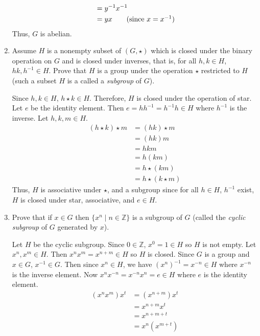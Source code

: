 \begin{enumerate}
\begin{align*}
       & = y^{-1}x^{-1}\\
       & = yx\tag{since \(x = x^{-1}\)}
  \end{align*}
  Thus, \(G\) is abelian.
\item
  Assume \(H\) is a nonempty subset of \((G, \star)\) which is closed under the
  binary operation on \(G\) and is closed under inverses, that is, for all
  \(h,k\in H\), \(hk, h^{-1}\in H\).
  Prove that \(H\) is a group under the operation \(\star\) restricted to
  \(H\) (such a subset \(H\) is a called a \textit{subgroup} of \(G\)).
  \par\smallskip
  Since \(h,k\in H\), \(h\star k\in H\).
  Therefore, \(H\) is closed under the operation of star.
  Let \(e\) be the identity element.
  Then \(e = hh^{-1} = h^{-1}h\in H\) where \(h^{-1}\) is the inverse.
  Let \(h,k,m\in H\).
  \begin{align*}
    (h\star k)\star m & = (hk)\star m\\
                      & = (hk)m\\
                      & = hkm\\
                      & = h(km)\\
                      & = h\star (km)\\
                      & = h\star (k\star m)
  \end{align*}
  Thus, \(H\) is associative under \(\star\), and a subgroup since for all
  \(h\in H\), \(h^{-1}\) exist, \(H\) is closed under star, associative, and
  \(e\in H\).
\item
  Prove that if \(x\in G\) then \(\{x^n\mid n\in\mathbb{Z}\}\) is a subgroup of
  \(G\) (called the \textit{cyclic subgroup} of \(G\) generated by \(x\)).
  \par\smallskip
  Let \(H\) be the cyclic subgroup.
  Since \(0\in\mathbb{Z}\), \(x^0 = 1\in H\) so \(H\) is not empty.
  Let \(x^n,x^m\in H\).
  Then \(x^nx^m = x^{n + m}\in H\) so \(H\) is closed.
  Since \(G\) is a group and \(x\in G\), \(x^{-1}\in G\).
  Then since \(x^n\in H\), we have \((x^n)^{-1} = x^{-n}\in H\) where
  \(x^{-n}\) is the inverse element.
  Now \(x^nx^{-n} = x^{-n}x^n = e\in H\) where \(e\) is the identity element.
  \begin{align*}
    (x^nx^m)x^t & = (x^{n + m})x^t\\
                & = x^{n + m}x^t\\
                & = x^{n + m + t}\\
                & = x^n(x^{m + t})\\

\end{align*}
\end{enumerate}
